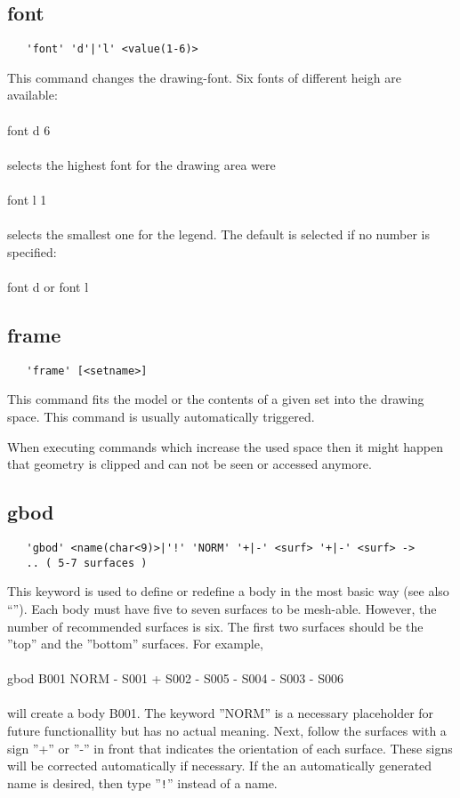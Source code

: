 \documentclass{article}
\begin{document}
\subsection{\label{font}font}
\begin{verbatim}
   'font' 'd'|'l' <value(1-6)>
\end{verbatim}
This command changes the drawing-font. Six fonts of different heigh are available:
\\\\font d 6\\\\selects the highest font for the drawing area were\\\\font l 1\\\\selects the smallest one for the legend. The default is selected if no number is specified:\\\\font d or font l

\subsection{\label{frame}frame}
\begin{verbatim}
   'frame' [<setname>]
\end{verbatim}
This command fits the model or the contents of a given set into the drawing space. This command is usually automatically triggered. 

When executing commands which increase the used space then it might happen that geometry is clipped and can not be seen or accessed anymore. 

\subsection{\label{gbod}gbod}
\begin{verbatim}
   'gbod' <name(char<9)>|'!' 'NORM' '+|-' <surf> '+|-' <surf> ->
   .. ( 5-7 surfaces )
\end{verbatim}
This keyword is used to define or redefine a body in the most basic way (see also ``''). Each body must have five to seven surfaces to be mesh-able. However, the number of recommended surfaces is six. The first two surfaces should be the ''top'' and the ''bottom'' surfaces. For example,\\\\gbod B001 NORM - S001 + S002 - S005 - S004 - S003 - S006\\\\will create a body B001. The keyword ''NORM'' is a necessary placeholder for future functionallity but has no actual meaning. Next, follow the surfaces with a sign ''+'' or ''-'' in front that indicates the orientation of each surface. These signs will be corrected automatically if necessary. If the an automatically generated name is desired, then type ''\verb_!_'' instead of a name.
\end{document}
